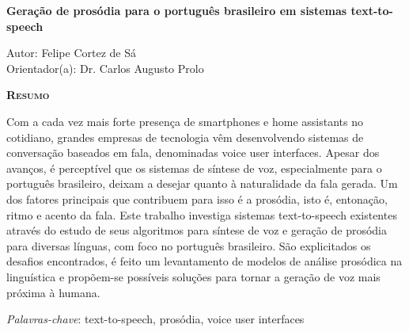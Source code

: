 \begin{center}
	{\Large{\textbf{Geração de prosódia para o português brasileiro em sistemas text-to-speech}}}
\end{center}

\vspace{1cm}

\begin{flushright}
	Autor: Felipe Cortez de Sá \\
	Orientador(a): Dr. Carlos Augusto Prolo
\end{flushright}

\vspace{1cm}

\begin{center}
	\Large{\textsc{\textbf{Resumo}}}
\end{center}

\noindent Com a cada vez mais forte presença de smartphones e home assistants no
cotidiano, grandes empresas de tecnologia vêm desenvolvendo sistemas de
conversação baseados em fala, denominadas voice user interfaces. Apesar dos avanços, é perceptível que os sistemas de síntese de voz, especialmente para o português brasileiro, deixam a desejar quanto à naturalidade da fala gerada. Um dos fatores principais que contribuem para isso é a prosódia, isto é, entonação, ritmo e acento da fala. Este trabalho investiga sistemas text-to-speech existentes através do estudo de seus algoritmos para síntese de voz e geração de prosódia para diversas línguas, com foco no português brasileiro. São explicitados os desafios encontrados, é feito um levantamento de modelos de análise prosódica na linguística e propõem-se possíveis soluções para tornar a geração de voz mais próxima à humana.

\noindent\textit{Palavras-chave}: text-to-speech, prosódia, voice user interfaces
